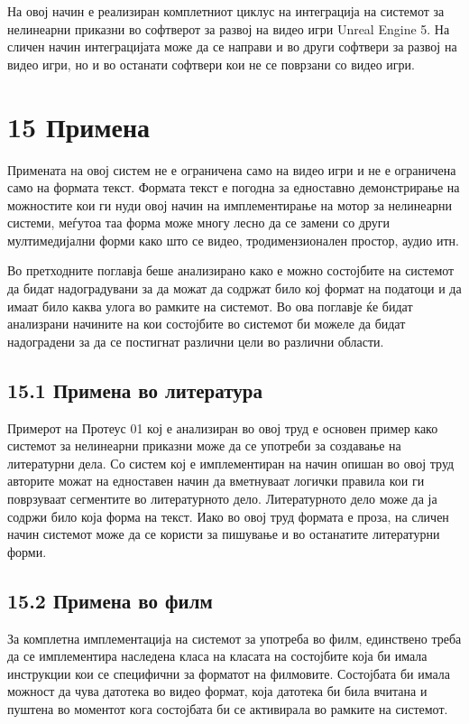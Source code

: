 На овој начин е реализиран комплетниот циклус на интеграција на системот за нелинеарни приказни во софтверот за развој на видео игри Unreal Engine 5. На сличен начин интеграцијата може да се направи и во други софтвери за развој на видео игри, но и во останати софтвери кои не се поврзани со видео игри.





\section{15 Примена}

Примената на овој систем не е ограничена само на видео игри и не е ограничена само на формата текст. Формата текст е погодна за едноставно демонстрирање на можностите кои ги нуди овој начин на имплементирање на мотор за нелинеарни системи, меѓутоа таа форма може многу лесно да се замени со други мултимедијални форми како што се видео, тродимензионален простор, аудио итн.

Во претходните поглавја беше анализирано како е можно состојбите на системот да бидат надоградувани за да можат да содржат било кој формат на податоци и да имаат било каква улога во рамките на системот. Во ова поглавје ќе бидат анализрани начините на кои состојбите во системот би можеле да бидат надоградени за да се постигнат различни цели во различни области.

\subsection{15.1 Примена во литература}

Примерот на Протеус 01 кој е анализиран во овој труд е основен пример како системот за нелинеарни приказни може да се употреби за создавање на литературни дела. Со систем кој е имплементиран на начин опишан во овој труд авторите можат на едноставен начин да вметнуваат логички правила кои ги поврзуваат сегментите во литературното дело. Литературното дело може да ја содржи било која форма на текст. Иако во овој труд формата е проза, на сличен начин системот може да се користи за пишување и во останатите литературни форми.

\subsection{15.2 Примена во филм}

За комплетна имплементација на системот за употреба во филм, единствено треба да се имплементира наследена класа на класата на состојбите која би имала инструкции кои се специфични за форматот на филмовите. Состојбата би имала можност да чува датотека во видео формат, која датотека би била вчитана и пуштена во моментот кога состојбата би се активирала во рамките на системот.

